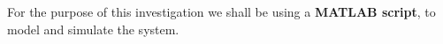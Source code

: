
    {For the purpose of this investigation we shall be using a \textbf{MATLAB script}, to model and simulate the system.}
        
        


